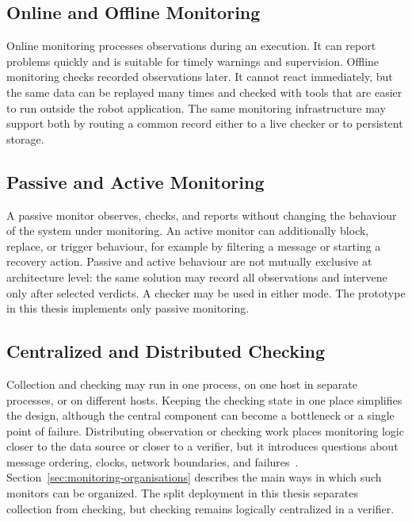 \subsection{Online and Offline Monitoring}

Online monitoring processes observations during an execution. It can report
problems quickly and is suitable for timely warnings and supervision. Offline
monitoring checks recorded observations later. It cannot react immediately, but the same data can be
replayed many times and checked with tools that are easier to run outside the
robot application. The same monitoring infrastructure may support both by
routing a common record either to a live checker or to persistent storage.

\subsection{Passive and Active Monitoring}

A passive monitor observes, checks, and reports without changing the behaviour
of the system under monitoring. An active monitor can additionally block,
replace, or trigger behaviour, for example by filtering a message or starting
a recovery action. Passive and active behaviour are not mutually exclusive at
architecture level: the same solution may record all observations and
intervene only after selected verdicts. A checker may be used in either mode.
The prototype in this thesis implements only passive monitoring.

\subsection{Centralized and Distributed Checking}

Collection and checking may run in one process, on one host in separate
processes, or on different hosts. Keeping the checking state in one place
simplifies the design, although the central component can become a bottleneck
or a single point of failure. Distributing observation or checking work places
monitoring logic closer to the data source or closer to a verifier, but it
introduces questions about message ordering, clocks, network boundaries, and
failures~\cite{francalanza2018distributed}.
Section~\ref{sec:monitoring-organisations} describes the main ways in which
such monitors can be organized. The split deployment in this thesis separates
collection from checking, but checking remains logically centralized in a
verifier.

